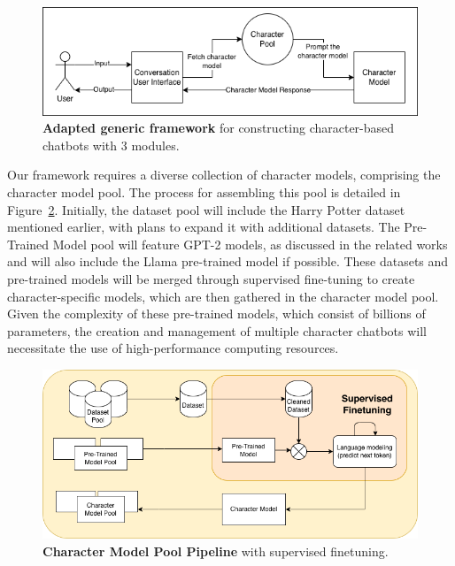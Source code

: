\documentclass[fleqn,moreauthors,10pt]{ds_report}
\begin{document}
\begin{figure}[ht]
        \centering 
	\includegraphics[width=\linewidth]{fig/Character_Chatbot_Pipeline.drawio.png}
	\caption{\textbf{Adapted generic framework} for constructing character-based chatbots with 3 modules.}
	\label{fig:application_diagram}
\end{figure}

    Our framework requires a diverse collection of character models, comprising the character model pool. The process for assembling this pool is detailed in Figure~\ref{fig:chatbot_pipeline}. Initially, the dataset pool will include the Harry Potter dataset mentioned earlier, with plans to expand it with additional datasets. The Pre-Trained Model pool will feature GPT-2 models, as discussed in the related works and will also include the Llama pre-trained model if possible. These datasets and pre-trained models will be merged through supervised fine-tuning to create character-specific models, which are then gathered in the character model pool. Given the complexity of these pre-trained models, which consist of billions of parameters, the creation and management of multiple character chatbots will necessitate the use of high-performance computing resources.

\begin{figure}[ht]
        \centering 
	\includegraphics[width=\linewidth]{fig/Character_Model_Pipeline.drawio.png}
	\caption{\textbf{Character Model Pool Pipeline} with supervised finetuning.}
	\label{fig:chatbot_pipeline}
\end{figure}
\end{document}
